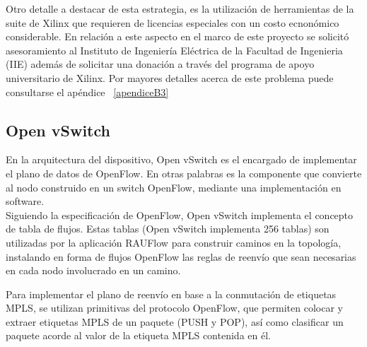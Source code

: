 Otro detalle a destacar de esta estrategia, es la utilizaci\'on de herramientas de la suite de Xilinx que requieren de licencias especiales con un costo ecnon\'omico considerable. En relaci\'on a este aspecto en el marco de este proyecto se solicit\'o asesoramiento al Instituto de Ingeniería Eléctrica de la Facultad de Ingenieria (IIE) adem\'as de solicitar una donaci\'on a trav\'es del programa de apoyo universitario de Xilinx. Por mayores detalles acerca de este problema puede consultarse el apéndice ~\ref{apendiceB3}



\subsection{Open vSwitch}
En la arquitectura del dispositivo, Open vSwitch es el encargado de implementar el plano de datos de OpenFlow. En otras palabras es la componente que convierte al nodo construido en un switch OpenFlow, mediante una implementaci\'on en software.\\

Siguiendo la especificaci\'on de OpenFlow, Open vSwitch implementa el concepto de tabla de flujos. Estas tablas (Open vSwitch implementa 256 tablas) son utilizadas por la aplicaci\'on RAUFlow para construir caminos en la topolog\'ia, instalando en forma de flujos OpenFlow las reglas de reenvío que sean necesarias en cada nodo involucrado en un camino.

Para implementar el plano de reenvío en base a la conmutaci\'on de etiquetas MPLS, se utilizan primitivas del protocolo OpenFlow, que permiten colocar y extraer etiquetas MPLS de un paquete (PUSH y POP), así como clasificar un paquete acorde al valor de la etiqueta MPLS contenida en \'el.\\

